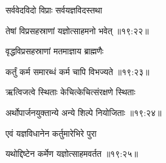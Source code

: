 {\devanagarifont सर्ववेदविदो विप्राः सर्वयज्ञविदस्तथा \thinspace{\dandab} \dontdisplaylinenum }%


{\devanagarifont तेषां विप्रसहस्राणां यज्ञोत्साहमनो भवेत् {॥१९:२२॥} \veg\dontdisplaylinenum }%

{\devanagarifont वृद्धविप्रसहस्राणां मतमाज्ञाय ब्राह्मणैः \thinspace{\dandab} \dontdisplaylinenum }%


{\devanagarifont कर्तुं कर्म समारब्धं कर्म चापि विभज्यते {॥१९:२३॥} \veg\dontdisplaylinenum }%

{\devanagarifont ऋत्विजत्वे स्थिताः केचित्केचित्संरक्षणे स्थिताः \thinspace{\dandab} \dontdisplaylinenum }%


{\devanagarifont अर्थोपार्जनयुक्तान्ये अन्ये शिल्पे नियोजिताः {॥१९:२४॥} \veg\dontdisplaylinenum }%

{\devanagarifont एवं यज्ञविधानेन कर्तुमारेभिरे पुरा \thinspace{\dandab} \dontdisplaylinenum }%


{\devanagarifont यथोद्दिष्टेन कर्मेण यज्ञोत्साहमवर्तत {॥१९:२५॥} \veg\dontdisplaylinenum }%

